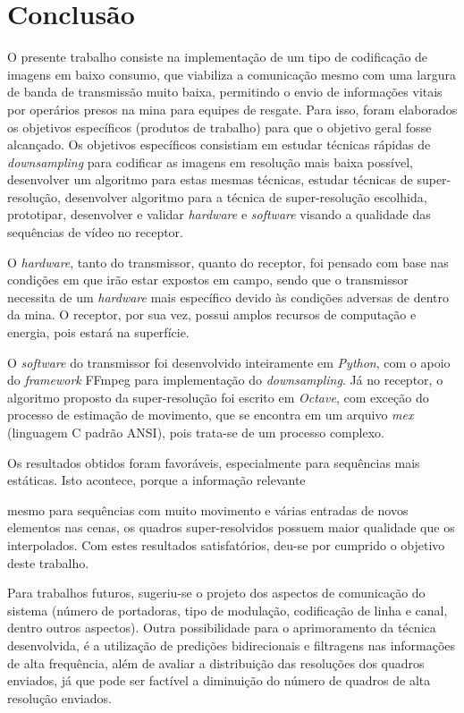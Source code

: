 \chapter[Conclusão]{Conclusão}

O presente trabalho consiste na implementação de um tipo de codificação de imagens em baixo consumo, que viabiliza a comunicação mesmo com uma largura de banda de transmissão muito baixa, permitindo o envio de informações vitais por operários presos na mina para equipes de resgate. 
Para isso, foram elaborados os objetivos específicos (produtos de trabalho) para que o objetivo geral fosse alcançado. Os objetivos específicos consistiam em estudar técnicas rápidas de \textit{downsampling} para codificar as imagens em resolução mais baixa possível, desenvolver um algoritmo para estas mesmas técnicas, estudar técnicas de super-resolução, desenvolver algoritmo para a técnica de super-resolução escolhida, prototipar, desenvolver e validar \textit{hardware} e \textit{software} visando a qualidade das sequências de vídeo no receptor.

O \textit{hardware}, tanto do transmissor, quanto do receptor, foi pensado com base nas condições em que irão estar expostos em campo, sendo que o transmissor necessita de um \textit{hardware} mais específico devido às condições adversas de dentro da mina. O receptor, por sua vez, possui amplos recursos de computação e energia, pois estará na superfície.

O \textit{software} do transmissor foi desenvolvido inteiramente em \textit{Python}, com o apoio do \textit{framework} FFmpeg para implementação do \textit{downsampling}. Já no receptor, o algoritmo proposto da super-resolução foi escrito em \textit{Octave}, com exceção do processo de estimação de movimento, que se encontra em um arquivo \textit{mex} (linguagem C padrão ANSI), pois trata-se de um processo complexo.  

Os resultados obtidos foram favoráveis, especialmente para sequências mais estáticas. Isto acontece, porque a informação relevante 


 mesmo para sequências com muito movimento e várias entradas de novos elementos nas cenas, os quadros super-resolvidos possuem maior qualidade que os interpolados. Com estes resultados satisfatórios, deu-se por cumprido o objetivo deste trabalho. 

Para trabalhos futuros, sugeriu-se o projeto dos aspectos de comunicação do sistema (número de portadoras, tipo de modulação, codificação de linha e canal, dentro outros aspectos). Outra possibilidade para o aprimoramento da técnica desenvolvida, é a utilização de predições bidirecionais e filtragens nas informações de alta frequência, além de avaliar a distribuição das resoluções dos quadros enviados, já que pode ser factível a diminuição do número de quadros de alta resolução enviados.

